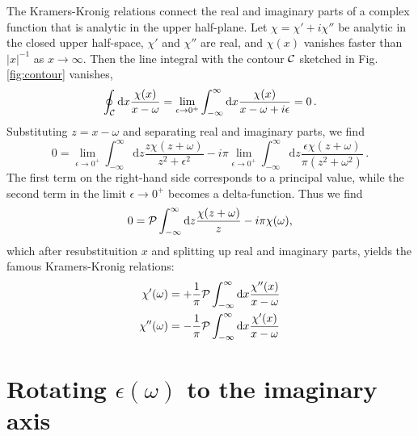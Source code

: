 \documentclass[twocolumn,superscriptaddress,pre]{revtex4-1}
\begin{document}
The Kramers-Kronig relations connect the real and imaginary parts of a complex
function that is analytic in the upper half-plane. Let $\chi=\chi'+i\chi''$ be
analytic in the closed upper half-space, $\chi'$ and $\chi''$ are real, and
$\chi(x)$ vanishes faster than $|x|^{-1}$ as $x\to\infty$. Then the line
integral with the contour $\cal C$ sketched in Fig. \ref{fig:contour} vanishes,
\begin{equation}
\oint_{\cal C} \mathrm{d}x \frac{\chi(x)}{x-\omega} = \lim_{\epsilon\to0^+} \int_{-\infty}^\infty \mathrm{d}x \frac{\chi(x)}{x-\omega+i\epsilon} = 0 \,.
\end{equation}
Substituting $z=x-\omega$ and separating real and imaginary parts, we find
\begin{equation}
0 = \lim_{\epsilon\to0^+}\int_{-\infty}^\infty \mathrm{d}z \frac{z \chi(z+\omega)}{z^2+\epsilon^2} - i\pi \lim_{\epsilon\to0^+} \int_{-\infty}^\infty \mathrm{d}z \frac{\epsilon \chi(z+\omega)}{\pi(z^2+\omega^2)} \,.
\end{equation}
The first term on the right-hand side corresponds to a principal value, while
the second term in the limit $\epsilon\to0^+$ becomes a delta-function. Thus we find
\begin{equation}
0 = {\cal P} \int_{-\infty}^\infty \mathrm{d}z \frac{\chi(z+\omega)}{z} - i\pi \chi(\omega),
\end{equation}
which after resubstituition $x$ and splitting up real and imaginary parts,
yields the famous Kramers-Kronig relations:
\begin{align}
\label{eq:KK1}
\chi'(\omega)  &= +\frac{1}{\pi} {\cal P} \int_{-\infty}^\infty \mathrm{d}x \frac{\chi''(x)}{x-\omega} \\
\label{eq:KK2}
\chi''(\omega) &= -\frac{1}{\pi} {\cal P} \int_{-\infty}^\infty \mathrm{d}x \frac{\chi'(x) }{x-\omega}
\end{align}


\section{Rotating $\epsilon(\omega)$ to the imaginary axis}
\end{document}
